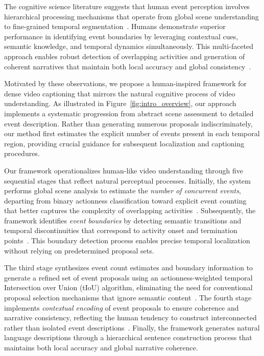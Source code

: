 The cognitive science literature suggests that human event perception involves hierarchical processing mechanisms that operate from global scene understanding to fine-grained temporal segmentation~\cite{zacks2007event,kurby2008segmentation}. Humans demonstrate superior performance in identifying event boundaries by leveraging contextual cues, semantic knowledge, and temporal dynamics simultaneously. This multi-faceted approach enables robust detection of overlapping activities and generation of coherent narratives that maintain both local accuracy and global consistency~\cite{radvansky2006event,speer2007reading}.

Motivated by these observations, we propose a human-inspired framework for dense video captioning that mirrors the natural cognitive process of video understanding. As illustrated in Figure~\ref{fig:intro_overview}, our approach implements a systematic progression from abstract scene assessment to detailed event description. Rather than generating numerous proposals indiscriminately, our method first estimates the explicit number of events present in each temporal region, providing crucial guidance for subsequent localization and captioning procedures.

Our framework operationalizes human-like video understanding through five sequential stages that reflect natural perceptual processes. Initially, the system performs global scene analysis to estimate the \textit{number of concurrent events}, departing from binary actionness classification toward explicit event counting that better captures the complexity of overlapping activities~\cite{yuan2017temporal,lin2018bsn}. Subsequently, the framework identifies \textit{event boundaries} by detecting semantic transitions and temporal discontinuities that correspond to activity onset and termination points~\cite{long2019gaussian,zhao2020bottom}. This boundary detection process enables precise temporal localization without relying on predetermined proposal sets.

The third stage synthesizes event count estimates and boundary information to generate a refined set of event proposals using an actionness-weighted temporal Intersection over Union (tIoU) algorithm, eliminating the need for conventional proposal selection mechanisms that ignore semantic content~\cite{lin2019bmn,hosang2017learning}. The fourth stage implements \textit{contextual encoding} of event proposals to ensure coherence and narrative consistency, reflecting the human tendency to construct interconnected rather than isolated event descriptions~\cite{zhu2020understanding,wang2018temporal}. Finally, the framework generates natural language descriptions through a hierarchical sentence construction process that maintains both local accuracy and global narrative coherence.

